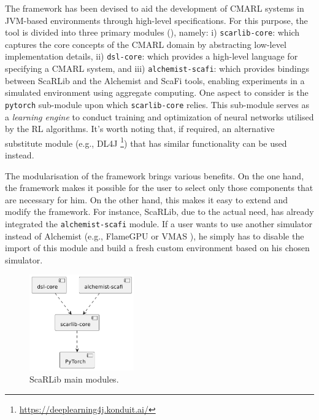 \documentclass[12pt,a4paper,openright,twoside]{book}
\begin{document}
The framework has been devised to aid the development of CMARL systems in JVM-based environments through high-level 
    specifications. For this purpose, the tool is divided into three primary modules (), namely:
    i) \texttt{scarlib-core}:  which captures the core concepts of the CMARL domain by abstracting low-level 
        implementation details,
    ii) \texttt{dsl-core}: which provides a high-level language for specifying a CMARL system, and
    iii) \texttt{alchemist-scafi}: which provides bindings between ScaRLib and the Alchemist and ScaFi tools, enabling 
        experiments in a simulated environment using aggregate computing.
    One aspect to consider is the \texttt{pytorch} sub-module upon which \texttt{scarlib-core} relies. This sub-module serves as 
    a \emph{learning engine} to conduct training and optimization of neural networks utilised by the RL algorithms. 
    It's worth noting that, if required, an alternative substitute module (e.g., DL4J \footnote{\url{https://deeplearning4j.konduit.ai/}})
    that has similar functionality can be used instead.

The modularisation of the framework brings various benefits. On the one hand, the framework makes it possible 
    for the user to select only those components that are necessary for him. On the other hand, this makes it 
    easy to extend and modify the framework. For instance, ScaRLib, due to the actual need, has already 
    integrated the \texttt{alchemist-scafi} module. If a user wants to use another simulator instead of Alchemist 
    (e.g., FlameGPU \cite{flame} or VMAS \cite{bettini2022vmas}), he simply has to disable the import of this module and build a fresh 
    custom environment based on his chosen simulator.

\begin{figure}
    \centering
    \includegraphics[width=0.4\textwidth]{figures/scarlib-modules.pdf}
    \caption{ScaRLib main modules.}
    \label{fig:mainmodules}
\end{figure}
\end{document}
